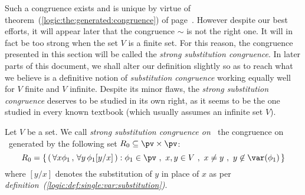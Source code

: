 Such a congruence exists and is unique by virtue of
theorem~(\ref{logic:the:generated:congruence}) of
page~\pageref{logic:the:generated:congruence}. However despite our
best efforts, it will appear later that  the congruence $\sim$ is
not the right one. It will in fact be too strong when the set $V$ is
a finite set. For this reason, the congruence presented in this
section will be called the {\em strong substitution congruence}. In
later parts of this document, we shall alter our definition slightly
so as to reach what we believe is a definitive notion of {\em
substitution congruence} working equally well for $V$ finite and $V$
infinite. Despite its minor flaws, the {\em strong substitution
congruence} deserves to be studied in its own right, as it seems to
be the one studied in every known textbook (which usually assumes an
infinite set $V$).
\begin{defin}\label{logic:def:strong:sub:congruence}
Let $V$ be a set. We call {\em strong substitution congruence on
\pv\ }the congruence on \pv\ generated by the following set
$R_{0}\subseteq \pv\times\pv$:
    \[
    R_{0}=\left\{\,(\,\forall x\phi_{1}\,,\,\forall
    y\,\phi_{1}[y/x]\,):\phi_{1}\in\pv\ ,\ x,y\in V\ ,\ x\neq y\ ,\
    y\not\in\var(\phi_{1})\,\right\}
    \]
where $[y/x]$ denotes the substitution of $y$ in place of $x$ as per
{\em definition~(\ref{logic:def:single:var:substitution})}.
\end{defin}
